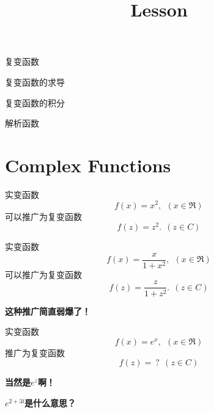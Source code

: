 \documentclass[CJK]{beamer}
\title{Lesson }
\author{}
\date{}
\begin{document}


\begin{frame}
\bch
\bitem
\item{复变函数}
\item{复变函数的求导}
\item{复变函数的积分}
\item{解析函数}
\eitem
\ech
\end{frame}


\section{Complex Functions}


\begin{frame}
  \bch
  

  \bex
  实变函数
  $$f(x) = x^2, \ \ (x\in \Re)$$
  可以推广为复变函数
  $$f(z) = z^2. \ \ (z\in C) $$
  \eex

  \ech
\end{frame}


\begin{frame}
  \bch
  

  \bex
  实变函数
  $$f(x) = \frac{x}{1+x^2},\ \ (x\in \Re)$$
  可以推广为复变函数
  $$f(z) = \frac{z}{1+z^2}. \ \ (z\in C)$$
  \eex

  \ech
\end{frame}



\begin{frame}
  \bch

  \bcenter
      {\bf \Large 这种推广简直弱爆了！}

      \ecenter
  \ech
\end{frame}


\begin{frame}
  \bch
  实变函数
  $$f(x) = e^x,\ \ (x\in \Re)$$
  推广为复变函数
  $$f(z) = \ ? \ \ (z\in C)$$
  \ech
\end{frame}

\begin{frame}
  \bch
  \bcenter
  {\bf \Large 当然是$e^z$啊！}
  \ecenter
  \ech
\end{frame}


\begin{frame}
  \bch
  \bcenter
  {\Large \bf  $e^{2+3\ii}$是什么意思？}
  \ecenter
  \ech
\end{frame}
\end{document}
